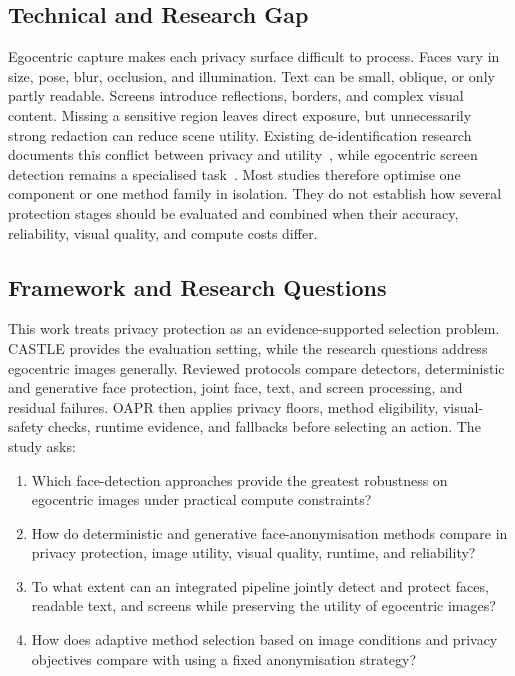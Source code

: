 \documentclass[10pt,twocolumn]{IEEEtran}
\begin{document}
\subsection{Technical and Research Gap}

Egocentric capture makes each privacy surface difficult to process. Faces vary
in size, pose, blur, occlusion, and illumination. Text can be small, oblique, or
only partly readable. Screens introduce reflections, borders, and complex visual
content. Missing a sensitive region leaves direct exposure, but unnecessarily
strong redaction can reduce scene utility. Existing de-identification research
documents this conflict between privacy and utility~\cite{khan2025persondeid},
while egocentric screen detection remains a specialised task~\cite{li2026screen}.
Most studies therefore optimise one component or one method family in isolation.
They do not establish how several protection stages should be evaluated and
combined when their accuracy, reliability, visual quality, and compute costs
differ.

\subsection{Framework and Research Questions}

This work treats privacy protection as an evidence-supported selection problem.
CASTLE provides the evaluation setting, while the research questions address
egocentric images generally. Reviewed protocols compare detectors, deterministic
and generative face protection, joint face, text, and screen processing, and
residual failures. OAPR then applies privacy floors, method eligibility,
visual-safety checks, runtime evidence, and fallbacks before selecting an action.
The study asks:

\begin{enumerate}
\item[\textbf{RQ1}] Which face-detection approaches provide the greatest
robustness on egocentric images under practical compute constraints?
\item[\textbf{RQ2}] How do deterministic and generative face-anonymisation
methods compare in privacy protection, image utility, visual quality, runtime,
and reliability?
\item[\textbf{RQ3}] To what extent can an integrated pipeline jointly detect and
protect faces, readable text, and screens while preserving the utility of
egocentric images?
\item[\textbf{RQ4}] How does adaptive method selection based on image conditions
and privacy objectives compare with using a fixed anonymisation strategy?
\end{enumerate}
\end{document}
